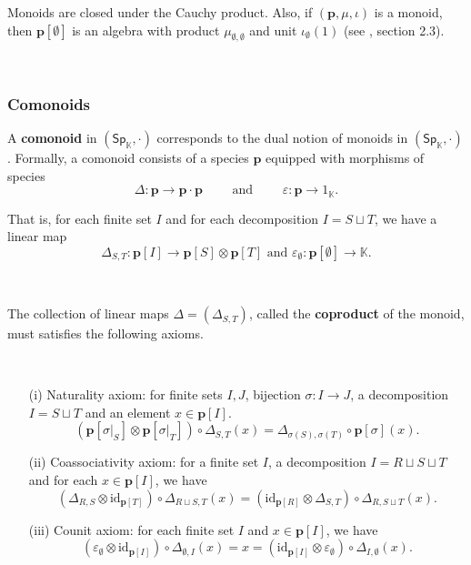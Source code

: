 \documentclass[12pt, reqno]{amsart}
\theoremstyle{definition}
\newcommand{\Ssk}{\mathsf{Sp}_\Kb} %
\newcommand{\Kb}{\mathbb{K}}
\newcommand{\tp}{\mathbf{p}}
\begin{document}
Monoids are closed under the Cauchy product. Also, if $(\tp, \mu, \iota)$ is a monoid, then $\tp[\emptyset]$ is an algebra with product $\mu_{\emptyset, \emptyset}$ and unit $\iota_\emptyset(1)$ (see \cite{AM2013}, section 2.3).


\

\subsubsection{Comonoids}
A {\bf comonoid} in $(\Ssk, \cdot)$ corresponds to the dual notion of monoids in $(\Ssk, \cdot)$. Formally, a comonoid consists of a species $\tp$ equipped with morphisms of species
\begin{equation*}
    \Delta: \tp \to \tp \cdot \tp \qquad \text{ and } \qquad \varepsilon: \tp \to 1_{\mathbb{K}}.
\end{equation*}

That is, for each finite set $I$ and for each decomposition $I=S \sqcup T$, we have a linear map 
\begin{equation*}
    \Delta_{S,T}: \tp[I] \to \tp[S] \otimes \tp[T] \text{ and } \varepsilon_\emptyset: \tp[\emptyset] \to \mathbb{K}.
\end{equation*}

\

The collection of linear maps $\Delta=(\Delta_{S,T})$, called the {\bf coproduct} of the monoid, must satisfies the following axioms.

\

\begin{itemize}
    \item[(i)] Naturality axiom: for finite sets $I, J$, bijection $\sigma: I \to J$, a decomposition $I = S \sqcup T$ and an element $x\in \tp [I]$.
\begin{equation*}
(\tp[\sigma|_S] \otimes \tp[\sigma|_T])\circ\Delta_{S,T}(x)=\Delta_{\sigma(S), \sigma(T)} \circ\tp[\sigma](x).
\end{equation*}

\item[(ii)] Coassociativity axiom: for a finite set $I$, a decomposition $I=R \sqcup S \sqcup T$ and for each $x \in \tp[I]$, we have
\begin{equation}\label{eq:coaxiomii}
    (\Delta_{R,S}\otimes \text{id}_{\tp[T]})\circ \Delta_{R \sqcup S, T}(x)=(\text{id}_{\tp[R]} \otimes \Delta_{S,T})\circ \Delta_{R, S \sqcup T}(x).
\end{equation}
\vspace{.1in}
\item[(iii)] Counit axiom: for each finite set $I$ and $x \in \tp[I]$, we have
\begin{equation*}
(\varepsilon_\emptyset \otimes \text{id}_{\tp[I]})\circ\Delta_{\emptyset, I}(x)= x = (\text{id}_{\tp[I]} \otimes \varepsilon_\emptyset)\circ\Delta_{I,\emptyset}(x).
\end{equation*}

\end{itemize}
\end{document}
